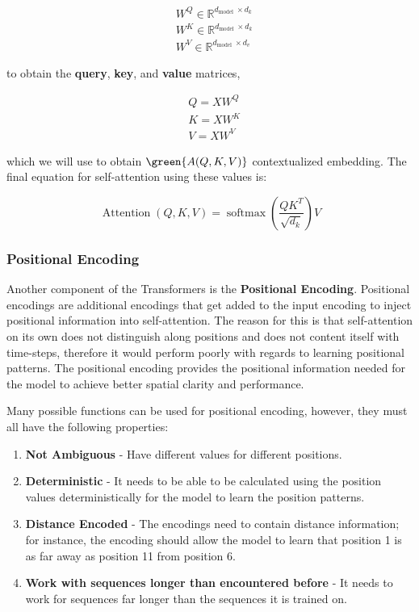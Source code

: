 $$
\begin{align*}
&W^Q \in \mathbb{R}^{d_{\text {model }} \times d_k} \\ &W^K \in \mathbb{R}^{d_{\text {model }} \times d_k} \\&W^V \in \mathbb{R}^{d_{\text {model }} \times d_v}
\end{align*}
$$

to obtain the \textbf{query}, \textbf{key}, and \textbf{value} matrices,

$$
{
\begin{align*}
&Q = XW^Q  \\
&K = XW^K\\
&V = XW^V
\end{align*}
}
$$

which we will use to obtain $\green{A(Q, K, V)}$ contextualized embedding. The final equation for self-attention using these values is:

$$
\operatorname{Attention}(Q, K, V)=\operatorname{softmax}\left(\frac{Q K^T}{\sqrt{d_k}}\right) V$$

\subsubsection{Positional Encoding}
Another component of the Transformers is the \textbf{Positional Encoding}. Positional encodings are additional encodings that get added to the input encoding to inject positional information into self-attention. The reason for this is that self-attention on its own does not distinguish along positions and does not content itself with time-steps, therefore it would perform poorly with regards to learning positional patterns. The positional encoding provides the positional information needed for the model to achieve better spatial clarity and performance.

Many possible functions can be used for positional encoding, however, they must all have the following properties:

\begin{enumerate}
    \item \textbf{Not Ambiguous} - Have different values for different positions.
    
    \item \textbf{Deterministic} - It needs to be able to be calculated using the position values deterministically for the model to learn the position patterns.
    
    \item \textbf{Distance Encoded} - The encodings need to contain distance information; for instance, the encoding should allow the model to learn that position 1 is as far away as position 11 from position 6.
    
    \item \textbf{Work with sequences longer than encountered before} - It needs to work for sequences far longer than the sequences it is trained on.
\end{enumerate}

